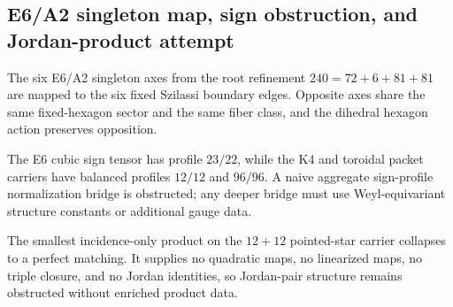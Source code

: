 \subsection{E6/A2 singleton map, sign obstruction, and Jordan-product attempt}
\label{sec:bt1547-bt1549-e6-a2-sign-jordan}

The six E6/A2 singleton axes from the root refinement $240=72+6+81+81$ are mapped to the six fixed Szilassi boundary edges.  Opposite axes share the same fixed-hexagon sector and the same fiber class, and the dihedral hexagon action preserves opposition.

The E6 cubic sign tensor has profile $23/22$, while the K4 and toroidal packet carriers have balanced profiles $12/12$ and $96/96$.  A naive aggregate sign-profile normalization bridge is obstructed; any deeper bridge must use Weyl-equivariant structure constants or additional gauge data.

The smallest incidence-only product on the $12+12$ pointed-star carrier collapses to a perfect matching.  It supplies no quadratic maps, no linearized maps, no triple closure, and no Jordan identities, so Jordan-pair structure remains obstructed without enriched product data.

